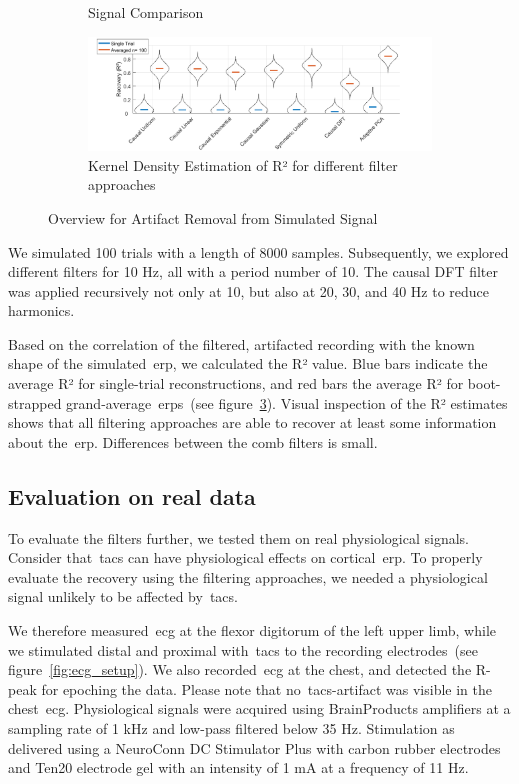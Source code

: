 \documentclass[a4paper]{article}
\newcommand{\figref}[1]{(see figure~\ref{#1})}
\begin{document}
\begin{figure}[hbtp]
\begin{subfigure}{0.75\textwidth}
\begin{subfigure}{.45\textwidth}
        \end{subfigure}
    \caption{Signal Comparison}\label{fig:simRaw}
    \end{subfigure}
    \begin{subfigure}{1.0\textwidth}
        \includegraphics[width=\textwidth]{img/eva/sim_R2.png}
        \caption{Kernel Density Estimation of R² for different filter approaches}\label{fig:simR2}
    \end{subfigure}
    \caption{Overview for Artifact Removal from  Simulated Signal}
\end{figure}

We simulated 100 trials with a length of 8000 samples. Subsequently, we explored different filters for 10 Hz, all with a period number of 10. The causal DFT filter was applied recursively not only at 10, but also at 20, 30, and 40 Hz to reduce harmonics.

Based on  the correlation of the filtered, artifacted recording with the known shape of the simulated~\gls{erp}, we calculated the R² value. Blue bars indicate the average R² for single-trial reconstructions, and red bars the average R² for boot-strapped grand-average~\gls{erp}s~\figref{fig:simR2}. Visual inspection of the R² estimates shows that all filtering approaches are able to recover at least some information about the~\gls{erp}. Differences between the comb filters is small.

\subsection{Evaluation on real data}\label{sec:EvaluationData}

To evaluate the filters further, we tested them on real physiological signals. Consider that~\gls{tacs} can have physiological effects on cortical~\gls{erp}. To properly evaluate the recovery using the filtering approaches, we needed a physiological signal unlikely to be affected by~\gls{tacs}.

We therefore measured~\gls{ecg} at the flexor digitorum of the left upper limb, while we stimulated distal and proximal with~\gls{tacs} to the recording electrodes~\figref{fig:ecg_setup}. We also recorded~\gls{ecg} at the chest, and detected the R-peak for epoching the data. Please note that no~\gls{tacs}-artifact was visible in the chest~\gls{ecg}.
Physiological signals were acquired using BrainProducts amplifiers at a sampling rate of 1 kHz and low-pass filtered below 35 Hz. Stimulation as delivered using a NeuroConn DC Stimulator Plus with carbon rubber electrodes and Ten20 electrode gel with an intensity of 1 mA at a frequency of 11 Hz.
\end{document}
